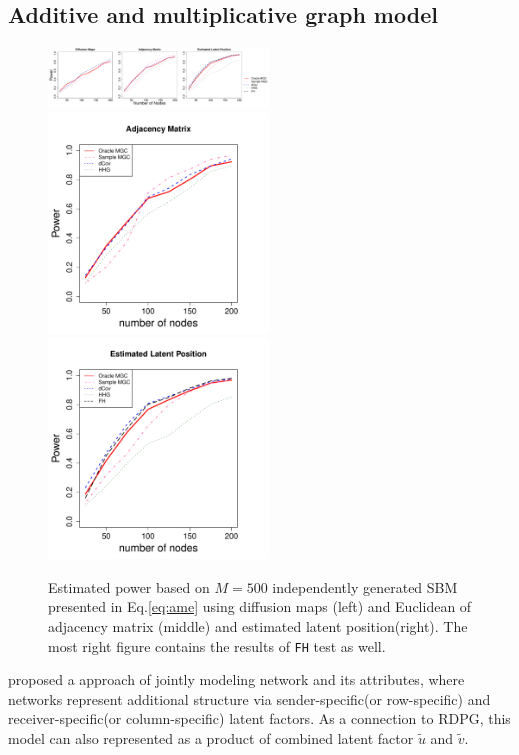 \documentclass[12pt]{article}
\theoremstyle{definition}
\begin{document}
	
\subsection{Additive and multiplicative graph model}

\begin{figure}[H]
	\centering
	\includegraphics[width=2.3in]{../Figure/ame.pdf}
	\includegraphics[width=2.3in]{../Figure/Eame.pdf}
	\includegraphics[width =2.3in]{../Figure/fame.pdf}
	\caption{Estimated power based on $M = 500$ independently generated SBM presented in Eq.\ref{eq:ame} using diffusion maps (left) and Euclidean of adjacency matrix (middle)  and estimated latent position(right). The most right figure contains the results of \texttt{FH} test as well.}
		\label{fig:ame}
\end{figure}

	
\cite{hoff2002latent} proposed a approach of jointly modeling network and its attributes, where networks represent additional structure via sender-specific(or row-specific) and receiver-specific(or column-specific) latent factors.
As a connection to RDPG, this model can also represented as a product of combined latent factor $\tilde{u}$ and $\tilde{v}$. 
	
\end{document}
